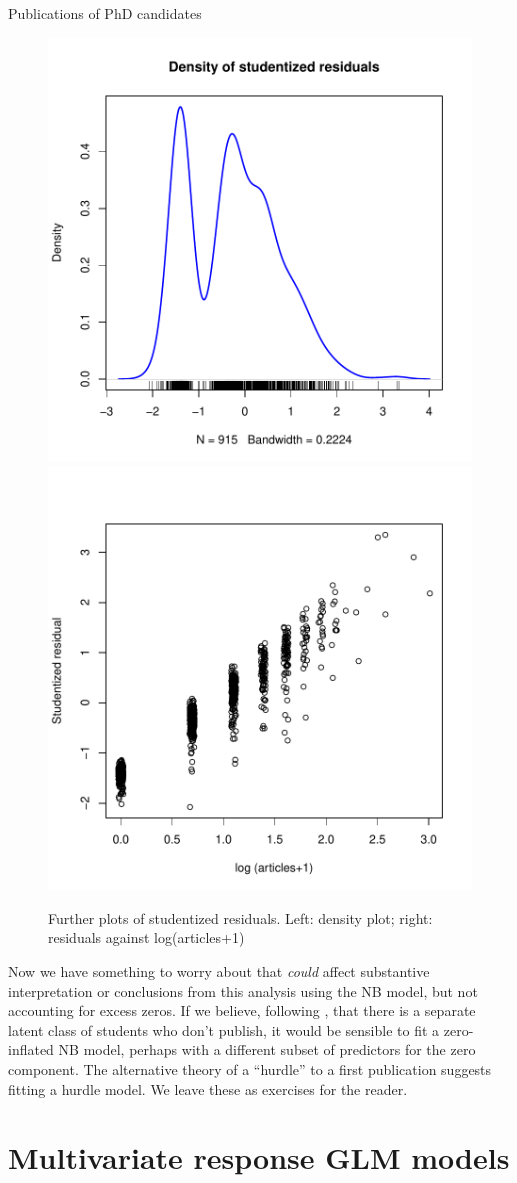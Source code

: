 \documentclass[11pt]{book}\usepackage[]{graphicx}\usepackage[]{color}
\newenvironment{knitrout}{}{} %
\renewenvironment{knitrout}{\small\renewcommand{\baselinestretch}{.85}}{} %
\begin{document}
\begin{Example}[phdpubs6]{Publications of PhD candidates}
\begin{knitrout}
\begin{figure}[!htbp]
\centerline{\includegraphics[width=.5\textwidth]{ch09/fig/phdpubs6-res-plots-1} 
\includegraphics[width=.5\textwidth]{ch09/fig/phdpubs6-res-plots-2} }

\caption[Further plots of studentized residuals]{Further plots of studentized residuals. Left: density plot; right: residuals against log(articles+1)\label{fig:phdpubs6-res-plots}}
\end{figure}


\end{knitrout}
Now we have something to worry about that \emph{could} affect substantive interpretation or conclusions from this
analysis using the NB model, but not accounting for excess zeros.
If we believe, following \citet{Long:1997}, that there is a separate latent class of students who don't
publish, it would be sensible to fit a zero-inflated NB model, perhaps with a different subset of
predictors for the zero component.  The alternative theory of a ``hurdle'' to a first publication
suggests fitting a hurdle model.  We leave these as exercises for the reader.

\end{Example}

\section{Multivariate response GLM models}\label{sec:glm-multiv}
\end{document}
